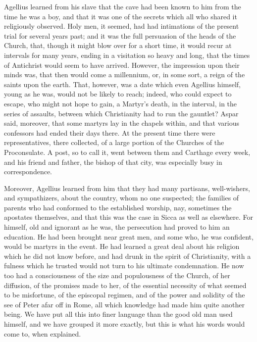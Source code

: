 Agellius learned from his slave that the cave had been known to him
from the time he was a boy, and that it was one of the secrets which
all who shared it religiously observed. Holy men, it seemed, had had
intimations of the present trial for several years past; and it was
the full persuasion of the heads of the Church, that, though it might
blow over for a short time, it would recur at intervals for many
years, ending in a visitation so heavy and long, that the times of Antichrist would seem to have arrived. However, the impression upon
their minds was, that then would come a millennium, or, in some sort,
a reign of the saints upon the earth. That, however, was a date which
even Agellius himself, young as he was, would not be likely to reach;
indeed, who could expect to escape, who might not hope to gain, a
Martyr's death, in the interval, in the series of assaults, between
which Christianity had to run the gauntlet? Aspar said, moreover, that
some martyrs lay in the chapels within, and that various confessors
had ended their days there. At the present time there were
representatives, there collected, of a large portion of the Churches
of the Proconsulate. A post, so to call it, went between them and
Carthage every week, and his friend and father, the bishop of that
city, was especially busy in correspondence.

Moreover, Agellius learned from him that they had many partisans,
well-wishers, and sympathizers, about the country, whom no one
suspected; the families of parents who had conformed to the
established worship, nay, sometimes the apostates themselves, and that
this was the case in Sicca as well as elsewhere. For himself, old and
ignorant as he was, the persecution had proved to him an education. He
had been brought near great men, and some who, he was confident, would
be martyrs in the event. He had learned a great deal about his
religion which he did not know before, and had drunk in the spirit of
Christianity, with a fulness which he trusted would not turn to his
ultimate condemnation. He now too had a consciousness of the
size and populousness of the Church, of her diffusion, of the promises
made to her, of the essential necessity of what seemed to be
misfortune, of the episcopal regimen, and of the power and solidity of
the see of Peter afar off in Rome, all which knowledge had made him
quite another being. We have put all this into finer language than the
good old man used himself, and we have grouped it more exactly, but
this is what his words would come to, when explained.

